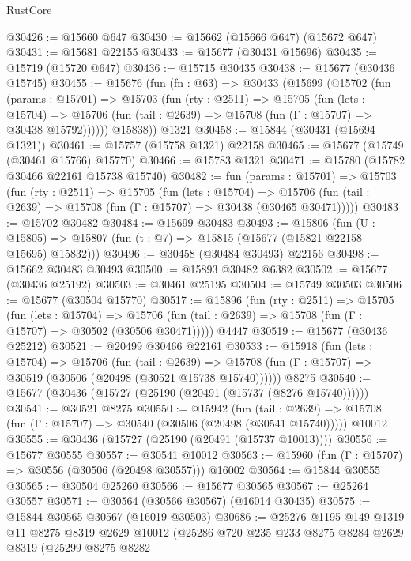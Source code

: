 \begin{lexlean}{RustCore}
\begin{coremodule}
@30426 := @15660 @647
@30430 := @15662 (@15666 @647) (@15672 @647)
@30431 := @15681 @22155
@30433 := @15677 (@30431 @15696)
@30435 := @15719 (@15720 @647)
@30436 := @15715 @30435
@30438 := @15677 (@30436 @15745)
@30455 := @15676
    (fun (fn : @63) =>
    @30433
      (@15699
        (@15702
          (fun (params : @15701) =>
          @15703
            (fun (rty : @2511) =>
            @15705
              (fun (lets : @15704) =>
              @15706 (fun (tail : @2639) => @15708 (fun (Γ : @15707) => @30438 @15792))))))
        @15838))
    @1321
@30458 := @15844 (@30431 (@15694 @1321))
@30461 := @15757 (@15758 @1321) @22158
@30465 := @15677 (@15749 (@30461 @15766) @15770)
@30466 := @15783 @1321
@30471 := @15780 (@15782 @30466 @22161 @15738 @15740)
@30482 := fun (params : @15701) =>
  @15703
    (fun (rty : @2511) =>
    @15705
      (fun (lets : @15704) =>
      @15706 (fun (tail : @2639) => @15708 (fun (Γ : @15707) => @30438 (@30465 @30471)))))
@30483 := @15702 @30482
@30484 := @15699 @30483
@30493 := @15806
    (fun (U : @15805) => @15807 (fun (t : @7) => @15815 (@15677 (@15821 @22158 @15695) @15832)))
@30496 := @30458 (@30484 @30493) @22156
@30498 := @15662 @30483 @30493
@30500 := @15893 @30482 @6382
@30502 := @15677 (@30436 @25192)
@30503 := @30461 @25195
@30504 := @15749 @30503
@30506 := @15677 (@30504 @15770)
@30517 := @15896
    (fun (rty : @2511) =>
    @15705
      (fun (lets : @15704) =>
      @15706 (fun (tail : @2639) => @15708 (fun (Γ : @15707) => @30502 (@30506 @30471)))))
    @4447
@30519 := @15677 (@30436 @25212)
@30521 := @20499 @30466 @22161
@30533 := @15918
    (fun (lets : @15704) =>
    @15706
      (fun (tail : @2639) =>
      @15708 (fun (Γ : @15707) => @30519 (@30506 (@20498 (@30521 @15738 @15740))))))
    @8275
@30540 := @15677 (@30436 (@15727 (@25190 (@20491 (@15737 (@8276 @15740))))))
@30541 := @30521 @8275
@30550 := @15942
    (fun (tail : @2639) => @15708 (fun (Γ : @15707) => @30540 (@30506 (@20498 (@30541 @15740)))))
    @10012
@30555 := @30436 (@15727 (@25190 (@20491 (@15737 @10013))))
@30556 := @15677 @30555
@30557 := @30541 @10012
@30563 := @15960 (fun (Γ : @15707) => @30556 (@30506 (@20498 @30557))) @16002
@30564 := @15844 @30555
@30565 := @30504 @25260
@30566 := @15677 @30565
@30567 := @25264 @30557
@30571 := @30564 (@30566 @30567) (@16014 @30435)
@30575 := @15844 @30565 @30567 (@16019 @30503)
@30686 := @25276
    @1195
    @149
    @1319
    @11
    @8275
    @8319
    @2629
    @10012
    (@25286
      @720
      @235
      @233
      @8275
      @8284
      @2629
      @8319
      (@25299
        @8275
        @8282

\end{coremodule}
\end{lexlean}
